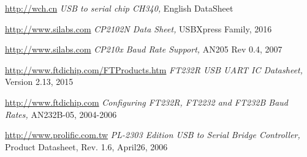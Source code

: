 \documentclass[pdftex,12pt,a4paper,oneside,english]{report}
\begin{document}
\begin{thebibliography}{99}
\url{http://wch.cn}
\emph{USB to serial chip CH340,}
English DataSheet

\url{http://www.silabs.com}
\emph{CP2102N Data Sheet,}
USBXpress Family,
2016

\url{http://www.silabs.com}
\emph{CP210x Baud Rate Support,}
AN205 Rev 0.4,
2007

\url{http://www.ftdichip.com/FTProducts.htm}
\emph{FT232R USB UART IC Datasheet,}
Version 2.13,
2015

\url{http://www.ftdichip.com}
\emph{Configuring FT232R, FT2232 and FT232B Baud Rates,}
AN232B-05,
2004-2006

\url{http://www.prolific.com.tw}
\emph{PL-2303 Edition USB to Serial Bridge Controller,}
Product Datasheet, Rev. 1.6,
April26, 2006

\end{thebibliography}
\end{document}
